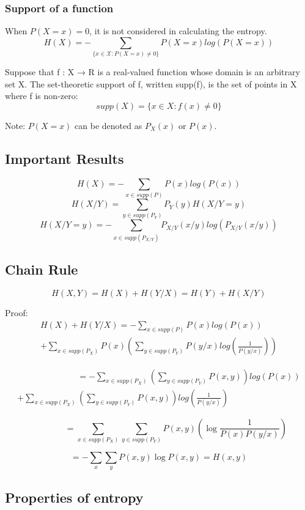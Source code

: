\documentclass{article}
\begin{document}
\subsubsection{Support of a function}

When $P(X=x)=0$, it is not considered in calculating the entropy.
$$ H(X)=-\sum_{ \{ x \in \mathcal{X} : P(X=x) \neq 0\} } P(X=x)log(P(X=x))$$

Suppose that f : X → R is a real-valued function whose domain is an arbitrary set X. The set-theoretic support of f, written supp(f), is the set of points in X where f is non-zero:
$$ supp(X)=\{ x \in X : f(x) \neq 0 \}$$

Note: $P(X=x)$ can be denoted as $P_X(x)$ or $P(x)$.
\subsection{Important Results}
     $$ H(X)= -\sum_{x \in supp(P)} P(x)log(P(x))$$
     $$ H(X/Y)= \sum_{y \in supp(P_Y)} P_Y(y)H(X/Y=y)$$
     $$ H(X/Y=y)= -\sum_{x \in supp(P_{X/Y})} P_{X/Y}(x/y)log(P_{X/Y}(x/y))$$

\subsection{Chain Rule}
$$ H(X,Y)=H(X)+H(Y/X)=H(Y)+H(X/Y)$$

Proof:
\begin{multline*}
     H(X)+H(Y/X)= -\sum_{x \in supp(P)} P(x)log(P(x)) \\
      + \sum_{x \in supp(P_X)} P(x)\left(\sum_{y \in supp(P_{Y})} P(y/x)log\left(\frac{1}{P(y/x)}\right)\right)
\end{multline*}

\begin{multline*}
    \qquad \qquad \qquad \quad= -\sum_{x \in supp(P_X)}\left(\sum_{y \in supp(P_Y)} P(x,y)\right)log(P(x)) \\
    + \sum_{x \in supp(P_X)} \left(\sum_{y \in supp(P_{Y})} P(x,y) \right) log\left(\frac{1}{P(y/x)}\right)
\end{multline*}


$$ \qquad \qquad =\sum_{x \in supp(P_X)} \sum_{y \in supp(P_{Y})} P(x,y)\left(\log \frac{1}{P(x)P(y/x)} \right)  $$

$$ = - \sum_x \sum_y P(x,y)\log P(x,y)=H(x,y)$$

\subsection{Properties of entropy}
\end{document}
